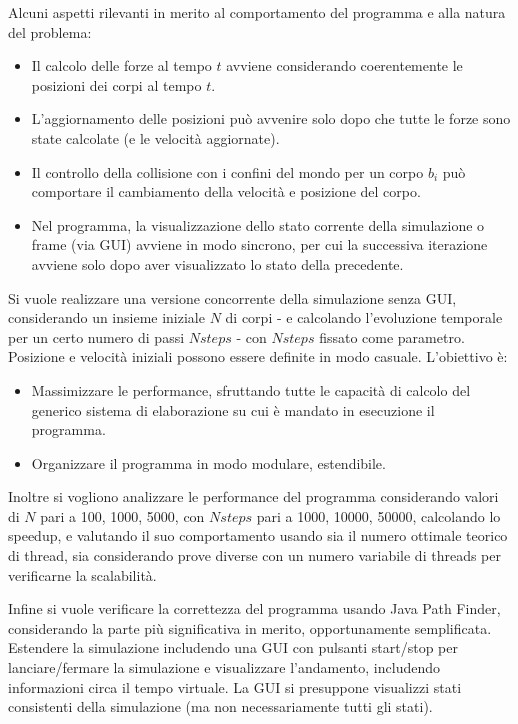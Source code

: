 \documentclass[12pt,a4paper,openright,twoside]{book}
\begin{document}
Alcuni aspetti rilevanti in merito al comportamento del programma e alla natura del problema:
\begin{itemize}
	\item Il calcolo delle forze al tempo $t$ avviene considerando coerentemente le posizioni dei corpi al tempo $t$. 
	\item L'aggiornamento delle posizioni può avvenire solo dopo che tutte le forze sono state calcolate (e le velocità aggiornate).
	\item Il controllo della collisione con i confini del mondo per un corpo $b_{i}$ può comportare il cambiamento della velocità e posizione del corpo.
	\item Nel programma, la visualizzazione dello stato corrente della simulazione o frame (via GUI) avviene in modo sincrono, per cui la successiva iterazione avviene solo dopo aver visualizzato lo stato della precedente.
\end{itemize}

Si vuole realizzare una versione concorrente della simulazione senza GUI, considerando un insieme iniziale $N$ di corpi
- e calcolando l'evoluzione temporale per un certo numero di passi $Nsteps$ -
con $Nsteps$ fissato come parametro. Posizione e velocità iniziali possono essere definite in modo casuale.
L'obiettivo è:
\begin{itemize}
	\item Massimizzare le performance, sfruttando tutte le capacità di calcolo del generico
	sistema di elaborazione su cui è mandato in esecuzione il programma.
	\item Organizzare il programma in modo modulare, estendibile.
\end{itemize}

Inoltre si vogliono analizzare le performance del programma considerando valori di $N$ pari a 100, 1000, 5000, con $Nsteps$ pari a 1000, 10000, 50000,
calcolando lo speedup, e valutando il suo comportamento usando sia il numero ottimale teorico di thread,
sia considerando prove diverse con un numero variabile di threads per verificarne la scalabilità.

Infine si vuole verificare la correttezza del programma usando Java Path Finder, considerando la parte più significativa in merito, opportunamente semplificata.
Estendere la simulazione includendo una GUI con pulsanti start/stop per lanciare/fermare la simulazione e visualizzare l'andamento,
includendo informazioni circa il tempo virtuale.
La GUI si presuppone visualizzi stati consistenti della simulazione (ma non necessariamente tutti gli stati).
\end{document}
